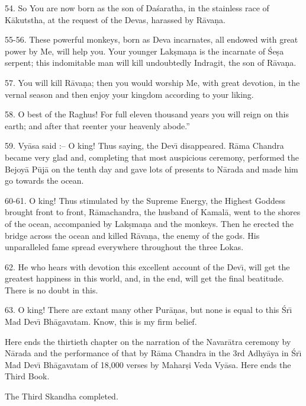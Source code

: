 54. So You are now born as the son of Da\'saratha, in the stainless race of K\=akutstha, at the request of the Devas, harassed by R\=ava\d{n}a.

55-56. These powerful monkeys, born as Deva incarnates, all endowed with great power by Me, will help you. Your younger Lak\d{s}ma\d{n}a is the incarnate of \'Se\d{s}a serpent; this indomitable man will kill undoubtedly Indragit, the son of R\=ava\d{n}a.

57. You will kill R\=ava\d{n}a; then you would worship Me, with great devotion, in the vernal season and then enjoy your kingdom according to your liking.

58. O best of the Raghus! For full eleven thousand years you will reign on this earth; and after that reenter your heavenly abode.''

59. Vy\=asa said :-- O king! Thus saying, the Dev\={\i} disappeared. R\=ama Chandra became very glad and, completing that most auspicious ceremony, performed the Bejoy\=a P\=uj\=a on the tenth day and gave lots of presents to N\=arada and made him go towards the ocean.

60-61. O king! Thus stimulated by the Supreme Energy, the Highest Goddess brought front to front, R\=amachandra, the husband of Kamal\=a, went to the shores of the ocean, accompanied by Lak\d{s}ma\d{n}a and the monkeys. Then he erected the bridge across the ocean and killed R\=ava\d{n}a, the enemy of the gods. His unparalleled fame spread everywhere throughout the three Lokas.

62. He who hears with devotion this excellent account of the Dev\={\i}, will get the greatest happiness in this world, and, in the end, will get the final beatitude. There is no doubt in this.

63. O king! There are extant many other Pur\=a\d{n}as, but none is equal to this \'Sr\={\i} Mad Dev\={\i} Bh\=agavatam. Know, this is my firm belief.

Here ends the thirtieth chapter on the narration of the Navar\=atra ceremony by N\=arada and the performance of that by R\=ama Chandra in the 3rd Adhy\=aya in \'Sr\={\i} Mad Dev\={\i} Bh\=agavatam of 18,000 verses by Mahar\d{s}i Veda Vy\=asa. Here ends the Third Book.

The Third Skandha completed.



